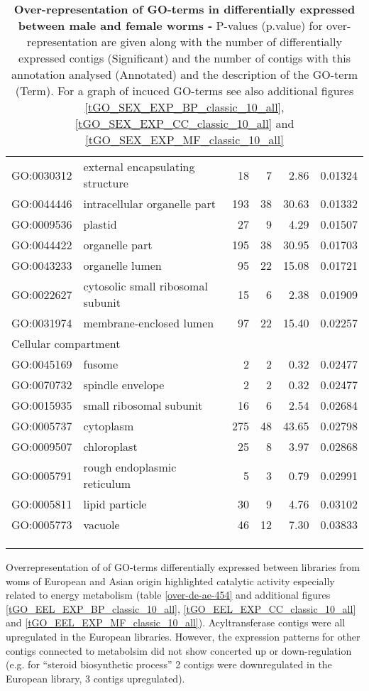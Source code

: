 \begin{longtable}{lp{4.5cm}rrrl}
  GO:0030312 & external encapsulating structure &  18 &   7 & 2.86 & 0.01324 \\ 
  GO:0044446 & intracellular organelle part & 193 &  38 & 30.63 & 0.01332 \\ 
  GO:0009536 & plastid &  27 &   9 & 4.29 & 0.01507 \\ 
  GO:0044422 & organelle part & 195 &  38 & 30.95 & 0.01703 \\ 
  GO:0043233 & organelle lumen &  95 &  22 & 15.08 & 0.01721 \\ 
  GO:0022627 & cytosolic small ribosomal subunit &  15 &   6 & 2.38 & 0.01909 \\ 
  GO:0031974 & membrane-enclosed lumen &  97 &  22 & 15.40 & 0.02257 \\ 
   \hline
   \multicolumn{6}{l}{Cellular compartment}  \\ 
GO:0045169 & fusome &   2 &   2 & 0.32 & 0.02477 \\ 
  GO:0070732 & spindle envelope &   2 &   2 & 0.32 & 0.02477 \\ 
  GO:0015935 & small ribosomal subunit &  16 &   6 & 2.54 & 0.02684 \\ 
  GO:0005737 & cytoplasm & 275 &  48 & 43.65 & 0.02798 \\ 
  GO:0009507 & chloroplast &  25 &   8 & 3.97 & 0.02868 \\ 
  GO:0005791 & rough endoplasmic reticulum &   5 &   3 & 0.79 & 0.02991 \\ 
  GO:0005811 & lipid particle &  30 &   9 & 4.76 & 0.03102 \\ 
  GO:0005773 & vacuole &  46 &  12 & 7.30 & 0.03833 \\ 
\hline\\
\caption[Over-representation of GO-terms in positively
selected]{\textbf{Over-representation of GO-terms in differentially
    expressed between male and female worms -} P-values (p.value) for
  over-representation are given along with the number of
  differentially expressed contigs (Significant) and the number of
  contigs with this annotation analysed (Annotated) and the
  description of the GO-term (Term). For a graph of incuced GO-terms
  see also additional figures \ref{tGO_SEX_EXP_BP_classic_10_all},
  \ref{tGO_SEX_EXP_CC_classic_10_all} and
  \ref{tGO_SEX_EXP_MF_classic_10_all}}\\
\label{over-de-mf-454}
\end{longtable}


Overrepresentation of of GO-terms differentially expressed between
libraries from woms of European and Asian origin highlighted catalytic
activity especially related to energy metabolism
(table \ref{over-de-ae-454} and additional figures
\ref{tGO_EEL_EXP_BP_classic_10_all},
\ref{tGO_EEL_EXP_CC_classic_10_all} and
\ref{tGO_EEL_EXP_MF_classic_10_all}).  Acyltransferase contigs were
all upregulated in the European libraries. However, the expression
patterns for other contigs connected to metabolsim did not show
concerted up or down-regulation (e.g. for ``steroid biosynthetic
process'' 2 contigs were downregulated in the European library, 3
contigs upregulated).


